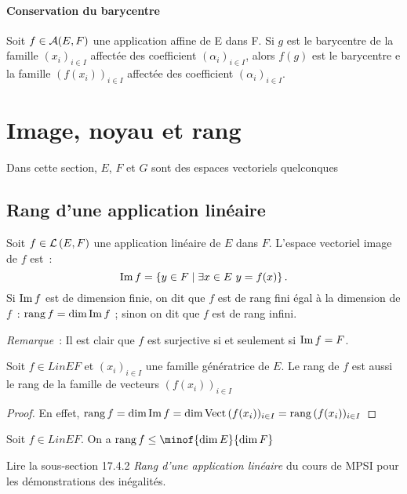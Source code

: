 \paragraph{Conservation du barycentre}
\begin{prop}
	Soit $f \in \mathcal{A}(E, F)$ une application affine de E dans F. Si $g$ est le barycentre de la famille $(x_i)_{i \in I}$ affectée des coefficient $(\alpha_i)_{i \in I}$, alors $f(g)$ est le barycentre e la famille $(f(x_i))_{i \in I}$ affectée des coefficient $(\alpha_i)_{i \in I}$.
\end{prop}

\section{Image, noyau et rang}
Dans cette section, $E$, $F$ et $G$ sont des espaces vectoriels quelconques
\subsection{Rang d'une application linéaire}
\begin{defdef}
	Soit $f \in \mathcal{L}\left(E,F\right)$ une application linéaire de $E$ dans $F$. L'espace vectoriel image de $f$ est~:
	\begin{equation}
		\operatorname{Im}{f} = \left\{y \in F\mathrel{}\middle|\mathrel{}\exists x \in E \ y=f(x)\right\}.
	\end{equation}
	Si $\operatorname{Im}{f}$ est de dimension finie, on dit que $f$ est de rang fini égal à la dimension de $f$~: $\operatorname{rang}{f} = \dim{\operatorname{Im}{f}}$ ; sinon on dit que $f$ est de rang infini.
\end{defdef}

\emph{Remarque}~: Il est clair que $f$ est surjective si et seulement si $\operatorname{Im}{f}=F$.

\begin{prop}
	Soit $f \in Lin{E}{F}$ et $(x_i)_{i \in I}$ une famille génératrice de $E$. Le rang de $f$ est aussi le rang de la famille de vecteurs $(f(x_i))_{i \in I}$
\end{prop}
\begin{proof}
	En effet, $\operatorname{rang}{f} = \operatorname{dim}{\operatorname{Im}{f}} = \operatorname{dim}{\operatorname{Vect}{(f(x_i))_{i \in I}}} = \operatorname{rang}{(f(x_i))_{i \in I}}$
\end{proof}
\begin{prop}
	Soit $f \in Lin{E}{F}$. On a $\rg{f} \leq \minof{\Dim{E}}{\Dim{F}}$
\end{prop}
Lire la sous-section 17.4.2 \emph{Rang d’une application linéaire} du cours de MPSI pour les démonstrations des inégalités.

